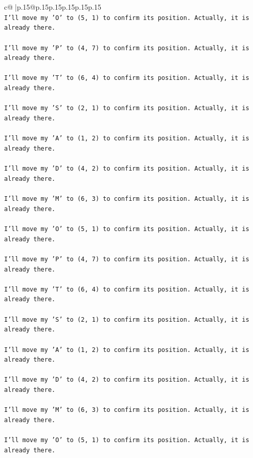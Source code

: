 \documentclass{article}
\begin{document}
{\begin{supertabular}{c@{$\;$}|p{.15\linewidth}@{}p{.15\linewidth}p{.15\linewidth}p{.15\linewidth}p{.15\linewidth}p{.15\linewidth}}
{{{\\ 
\texttt{I'll move my 'O' to (5, 1) to confirm its position. Actually, it is already there.} \\
\\ 
\texttt{I'll move my 'P' to (4, 7) to confirm its position. Actually, it is already there.} \\
\\ 
\texttt{I'll move my 'T' to (6, 4) to confirm its position. Actually, it is already there.} \\
\\ 
\texttt{I'll move my 'S' to (2, 1) to confirm its position. Actually, it is already there.} \\
\\ 
\texttt{I'll move my 'A' to (1, 2) to confirm its position. Actually, it is already there.} \\
\\ 
\texttt{I'll move my 'D' to (4, 2) to confirm its position. Actually, it is already there.} \\
\\ 
\texttt{I'll move my 'M' to (6, 3) to confirm its position. Actually, it is already there.} \\
\\ 
\texttt{I'll move my 'O' to (5, 1) to confirm its position. Actually, it is already there.} \\
\\ 
\texttt{I'll move my 'P' to (4, 7) to confirm its position. Actually, it is already there.} \\
\\ 
\texttt{I'll move my 'T' to (6, 4) to confirm its position. Actually, it is already there.} \\
\\ 
\texttt{I'll move my 'S' to (2, 1) to confirm its position. Actually, it is already there.} \\
\\ 
\texttt{I'll move my 'A' to (1, 2) to confirm its position. Actually, it is already there.} \\
\\ 
\texttt{I'll move my 'D' to (4, 2) to confirm its position. Actually, it is already there.} \\
\\ 
\texttt{I'll move my 'M' to (6, 3) to confirm its position. Actually, it is already there.} \\
\\ 
\texttt{I'll move my 'O' to (5, 1) to confirm its position. Actually, it is already there.} \\
}}}
\end{supertabular}}
\end{document}
